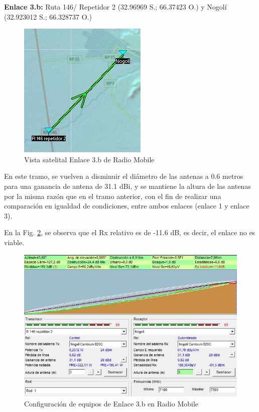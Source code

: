 \documentclass[12pt,a4paper]{book}
\begin{document}
\noindent\textbf{Enlace 3.b:} Ruta 146/ Repetidor 2 (32.96969 S.; 66.37423 O.) y Nogolí (32.923012 S.; 66.328737 O.)

\begin{figure} [H]
\centering
\includegraphics[width= 8 cm]{../figuras/red_transporte_11.jpg}
\caption{Vista satelital Enlace 3.b de Radio Mobile}
\label{fig_red_transporte_11}
\end{figure}

En este tramo, se vuelven a disminuir el diámetro de las antenas a 0.6 metros para una ganancia de antena de 31.1 dBi, y se mantiene la altura de las antenas por la misma razón que en el tramo anterior, con el fin de realizar una comparación en igualdad de condiciones, entre ambos enlaces (enlace 1 y enlace 3).

En la Fig. \ref{fig_red_transporte_12}, se observa que el Rx relativo es de -11.6 dB, es decir, el enlace no es viable.

\begin{figure} [H]
\centering
\includegraphics[width= 12 cm]{../figuras/red_transporte_12.jpg}
\caption{Configuración de equipos de Enlace 3.b en Radio Mobile}
\label{fig_red_transporte_12}
\end{figure}
\end{document}
